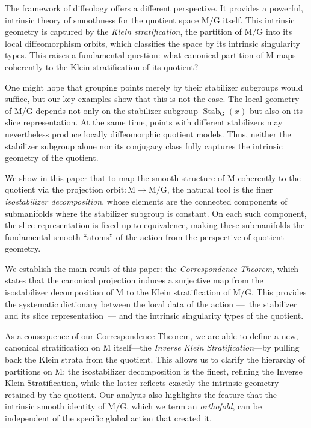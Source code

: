 \documentclass[10pt,reqno,letterpaper,twoside]{amsart}
\theoremstyle{article}
\def \G{\mathrm G}
\def \M{\mathrm M}
\DeclareMathOperator{\Stab}{Stab}
\newcommand{\orbit}{{\mathrm{orbit}}}
\begin{document}
  The framework of diffeology offers a different perspective.
  It provides a powerful,
  intrinsic theory of smoothness for the quotient space $\M/\G$ itself.
  This intrinsic geometry is captured by the \emph{Klein stratification},
  the partition of $\M/\G$ into its local diffeomorphism orbits,
  which classifies the space by its intrinsic singularity types.
  This raises a fundamental question:
  what canonical partition of $\M$ maps coherently to the Klein stratification of its quotient?
  
  One might hope that grouping points merely by their stabilizer subgroups would suffice,
  but our key examples show that this is not the case.
  The local geometry of $\M/\G$ depends not only on the stabilizer subgroup $\Stab_\G(x)$
  but also on its slice representation.
  At the same time,
  points with different stabilizers may nevertheless produce locally diffeomorphic quotient models.
  Thus,
  neither the stabilizer subgroup alone nor its conjugacy class fully captures the intrinsic geometry of the quotient.
  
  We show in this paper that to map the smooth structure of $\M$ coherently to the quotient via the projection $\orbit : \M \to \M/\G$,
  the natural tool is the finer \emph{isostabilizer decomposition},
  whose elements are the connected components of submanifolds where the stabilizer subgroup is constant.
  On each such component,
  the slice representation is fixed up to equivalence,
  making these submanifolds the fundamental smooth ``atoms'' of the action from the perspective of quotient geometry.
  
  We establish the main result of this paper:
  the \emph{Correspondence Theorem},
  which states that the canonical projection induces a surjective map from the isostabilizer decomposition of $\M$ to the Klein stratification of $\M/\G$.
  This provides the systematic dictionary between the local data of the action
  ---~the stabilizer and its slice representation~---
  and the intrinsic singularity types of the quotient.
  
  As a consequence of our Correspondence Theorem,
  we are able to define a new,
  canonical stratification on $\M$ itself—the \emph{Inverse Klein Stratification}—by pulling back the Klein strata from the quotient.
  This allows us to clarify the hierarchy of partitions on $\M$:
  the isostabilizer decomposition is the finest,
  refining the Inverse Klein Stratification,
  while the latter reflects exactly the intrinsic geometry retained by the quotient.
  Our analysis also highlights the feature that the intrinsic smooth identity of $\M/\G$,
  which we term an \emph{orthofold},
  can be independent of the specific global action that created it.
  
\end{document}
